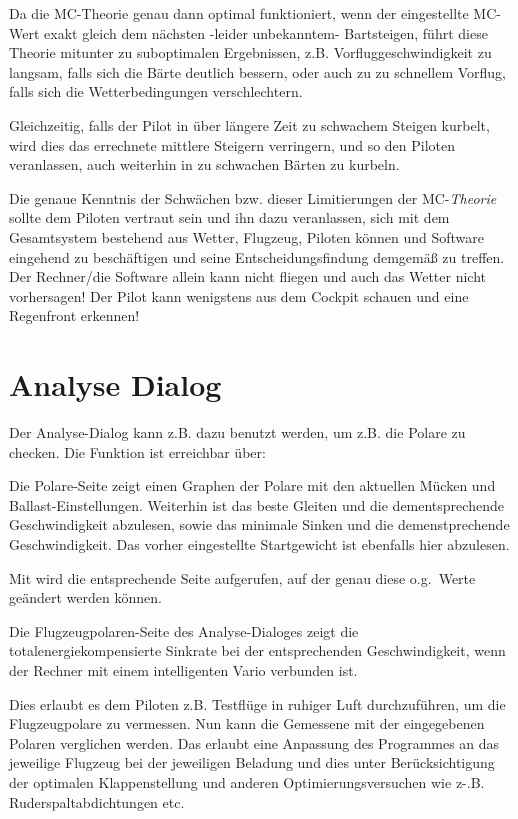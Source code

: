 Da die MC-Theorie genau dann optimal funktioniert, wenn der eingestellte MC-Wert exakt gleich dem
nächsten -leider unbekanntem- Bartsteigen, führt diese Theorie mitunter zu suboptimalen Ergebnissen,
z.B. Vorfluggeschwindigkeit zu langsam, falls sich die Bärte deutlich bessern, oder auch zu zu schnellem Vorflug,
falls sich die Wetterbedingungen verschlechtern.

Gleichzeitig,  falls der Pilot in über längere Zeit zu schwachem Steigen kurbelt,
wird dies das errechnete mittlere Steigern verringern, und so den Piloten veranlassen, auch
weiterhin in zu schwachen Bärten zu kurbeln.


\textsf{\textcolor[rgb]{0.00,0.00,0.50}
{Die genaue Kenntnis der Schwächen bzw. dieser Limitierungen
der MC-\textsl{Theorie} sollte  dem Piloten vertraut sein und ihn dazu veranlassen, sich mit dem
Gesamtsystem bestehend aus Wetter, Flugzeug, Piloten können und Software eingehend zu beschäftigen
und seine Entscheidungsfindung demgemäß zu treffen. Der Rechner/die Software allein kann nicht fliegen
und auch das Wetter nicht vorhersagen! Der Pilot kann wenigstens aus dem Cockpit schauen und eine
Regenfront erkennen!}}

\section{Analyse Dialog}

Der Analyse-Dialog kann z.B. dazu benutzt werden, um z.B. die Polare zu checken.
Die Funktion ist erreichbar über:

Die Polare-Seite zeigt einen  Graphen der Polare mit den aktuellen Mücken und Ballast-Einstellungen.
Weiterhin ist das beste Gleiten und die dementsprechende Geschwindigkeit abzulesen, sowie das
minimale Sinken und die demenstprechende Geschwindigkeit.
Das vorher eingestellte  Startgewicht ist ebenfalls hier  abzulesen.

Mit  wird die entsprechende Seite aufgerufen, auf der genau diese o.g.\ Werte geändert werden können.

Die Flugzeugpolaren-Seite  des Analyse-Dialoges zeigt die totalenergiekompensierte Sinkrate bei der
entsprechenden Geschwindigkeit, wenn der Rechner mit einem intelligenten Vario verbunden ist.

Dies erlaubt es dem Piloten z.B. Testflüge in ruhiger Luft durchzuführen, um die Flugzeugpolare zu vermessen.
Nun kann die Gemessene mit der eingegebenen Polaren verglichen werden. Das 
erlaubt eine Anpassung des Programmes an das jeweilige Flugzeug bei der jeweiligen Beladung 
und dies unter Berücksichtigung der optimalen Klappenstellung und anderen Optimierungsversuchen wie z-.B. 
Ruderspaltabdichtungen etc.

